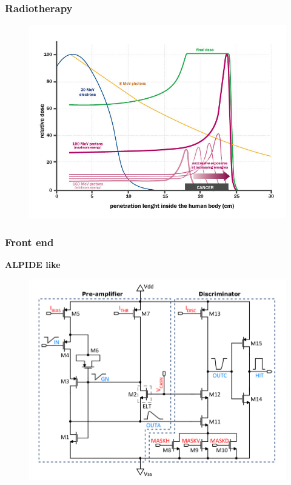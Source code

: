     \begin{frame}
        \frametitle{Radiotherapy}
        \begin{figure}[h!]
            \centering
            \includegraphics[width=.8\linewidth]{figures/pixel_detectors_usage/Bragg-Peak.png}
        \end{figure}
    \end{frame} 


    \begin{frame}
        \frametitle{Front end}
            \textbf{ALPIDE like}
            \begin{figure}[h!]
                \centering
                \includegraphics[width=.8\linewidth]{figures/Monopix1/Monopix1_FE_circuit.png}        
            \end{figure}
    \end{frame}     

